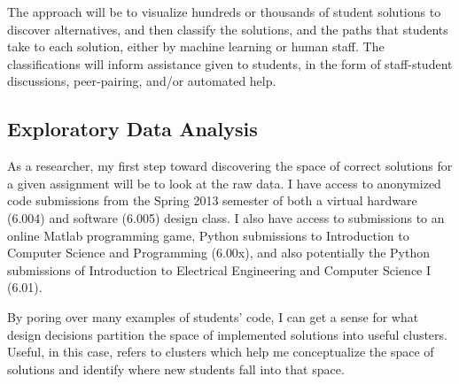 \documentclass[12pt]{article}
\begin{document}
The approach will be to visualize hundreds or thousands of student solutions to discover alternatives, and then classify the solutions, and the paths that students take to each solution, either by machine learning or human staff. The classifications will inform assistance given to students, in the form of staff-student discussions, peer-pairing, and/or automated help.


\subsection{Exploratory Data Analysis}

As a researcher, my first step toward discovering the space of correct solutions for a given assignment will be to look at the raw data. I have access to anonymized code submissions from the Spring 2013 semester of both a virtual hardware (6.004) and software (6.005) design class. I also have access to submissions to an online Matlab programming game, Python submissions to Introduction to Computer Science and Programming (6.00x), and also potentially the Python submissions of Introduction to Electrical Engineering and Computer Science I (6.01). 

By poring over many examples of students' code, I can get a sense for what design decisions partition the space of implemented solutions into useful clusters. Useful, in this case, refers to clusters which help me conceptualize the space of solutions and identify where new students fall into that space. 

\end{document}
